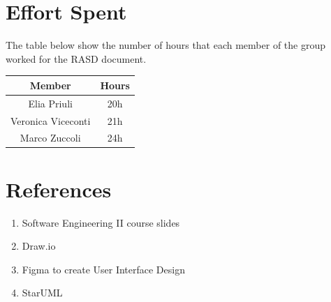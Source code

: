 \documentclass{article}
\begin{document}
\section{Effort Spent}
The table below show the number of hours that each member of the group worked for the RASD document.

\begin{table}[H]
    \begin{tabular}{|c|c|}
    \hline
        \textbf{Member}  & \textbf{Hours}\\ 
    \hline
        Elia Priuli &  20h\\
    \hline
        Veronica Viceconti & 21h \\
    \hline
        Marco Zuccoli & 24h \\
    \hline
    \end{tabular}
    \label{tab:my_label}
\end{table}


\section{References}
\begin{enumerate}
    \item Software Engineering II course slides
    \item Draw.io 
    \item Figma to create User Interface Design 
    \item StarUML
\end{enumerate}
\end{document}
